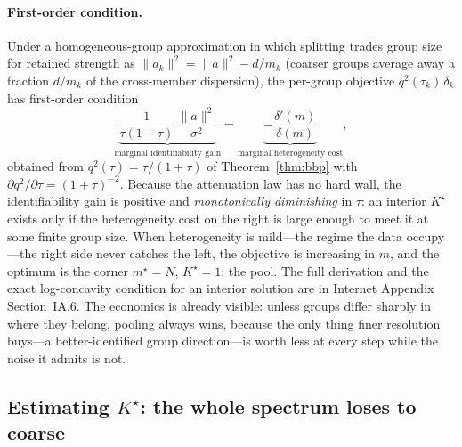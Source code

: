 \documentclass[12pt]{article}
\theoremstyle{plain}
\theoremstyle{definition}
\begin{document}
\paragraph{First-order condition.} Under a homogeneous-group approximation in
which splitting trades group size for retained strength as
$\lVert\bar a_k\rVert^2=\lVert a\rVert^2-d/m_k$ (coarser groups average away a
fraction $d/m_k$ of the cross-member dispersion), the per-group objective
$q^2(\tau_k)\,\delta_k$ has first-order condition
\begin{equation}
\label{eq:foc}
\underbrace{\frac{1}{\tau(1+\tau)}\,\frac{\lVert a\rVert^2}{\sigma^2}}
_{\text{marginal identifiability gain}}
=\underbrace{-\frac{\delta'(m)}{\delta(m)}}_{\text{marginal heterogeneity cost}},
\end{equation}
obtained from $q^2(\tau)=\tau/(1+\tau)$ of Theorem~\ref{thm:bbp} with
$\partial q^2/\partial\tau=(1+\tau)^{-2}$. Because the attenuation law has no
hard wall, the identifiability gain is positive and \emph{monotonically
diminishing} in $\tau$: an interior $K^\star$ exists only if the heterogeneity
cost on the right is large enough to meet it at some finite group size. When
heterogeneity is mild---the regime the data occupy---the right side never catches
the left, the objective is increasing in $m$, and the optimum is the corner
$m^\star=N$, $K^\star=1$: the pool. The full derivation and the exact
log-concavity condition for an interior solution are in Internet Appendix
Section~IA.6. The economics is already visible: unless groups differ sharply in
where they belong, pooling always wins, because the only thing finer resolution
buys---a better-identified group direction---is worth less at every step while
the noise it admits is not.
\subsection{Estimating $K^\star$: the whole spectrum loses to coarse}
\label{sec:kstar-emp}
\end{document}
